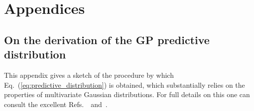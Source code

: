 
\setcounter{chapter}{-1}
\chapter{Appendices}
\renewcommand{\thechapter}{A}


\section{On the derivation of the GP predictive distribution}
\label{sec:Appendix_derivation_pred_dist}

This appendix gives a sketch of the procedure by which Eq.~(\ref{eq:predictive_distribution}) is obtained, which substantially relies on the properties of multivariate Gaussian distributions. For full details on this one can consult the excellent Refs.~\citep{--}~and~\citep{--}.
%

